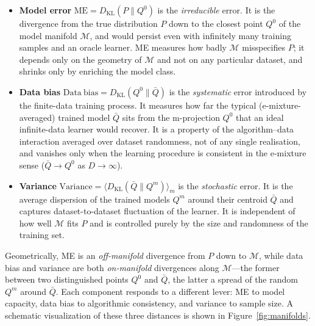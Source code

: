 \documentclass[11pt,a4paper]{article}
\theoremstyle{definition}
\theoremstyle{remark}
\newcommand{\KL}{D_{\mathrm{KL}}}
\newcommand{\PV}{P}
\newcommand{\QVz}{Q^{0}}
\newcommand{\QVm}{Q^{m}}
\newcommand{\QVbar}{\bar{Q}}
\newcommand{\Mfam}{\mathcal{M}}
\begin{document}
\begin{itemize}
\item[$\bullet$]
  \textbf{Model error}
  $\mathrm{ME} = \KL(\PV\|\QVz)$ is the \emph{irreducible} error.
  It is the divergence from the true distribution $\PV$ down to
  the closest point $\QVz$ of the model manifold $\Mfam$, and
  would persist even with infinitely many training samples and
  an oracle learner. ME measures how badly $\Mfam$ misspecifies
  $\PV$; it depends only on the geometry of $\Mfam$ and not on
  any particular dataset, and shrinks only by enriching the
  model class.
\item[$\bullet$]
  \textbf{Data bias}
  $\mathrm{Data\ bias} = \KL(\QVz\|\QVbar)$ is the
  \emph{systematic} error introduced by the finite-data training
  process. It measures how far the typical (e-mixture-averaged)
  trained model $\QVbar$ sits from the m-projection $\QVz$ that
  an ideal infinite-data learner would recover. It is a
  property of the algorithm--data interaction averaged over
  dataset randomness, not of any single realisation, and
  vanishes only when the learning procedure is consistent in
  the e-mixture sense ($\QVbar \to \QVz$ as $D\to\infty$).
\item[$\bullet$]
  \textbf{Variance}
  $\mathrm{Variance} = \langle\KL(\QVbar\|\QVm)\rangle_{m}$ is
  the \emph{stochastic} error. It is the average dispersion of
  the trained models $\QVm$ around their centroid $\QVbar$ and
  captures dataset-to-dataset fluctuation of the learner. It is
  independent of how well $\Mfam$ fits $\PV$ and is controlled
  purely by the size and randomness of the training set.
\end{itemize}

Geometrically, ME is an \emph{off-manifold} divergence from
$\PV$ down to $\Mfam$, while data bias and variance are both
\emph{on-manifold} divergences along $\Mfam$---the former
between two distinguished points $\QVz$ and $\QVbar$, the
latter a spread of the random $\QVm$ around $\QVbar$. Each
component responds to a different lever: ME to model capacity,
data bias to algorithmic consistency, and variance to sample
size. A schematic visualization of these three distances is
shown in Figure~\ref{fig:manifolds}.
\end{document}
